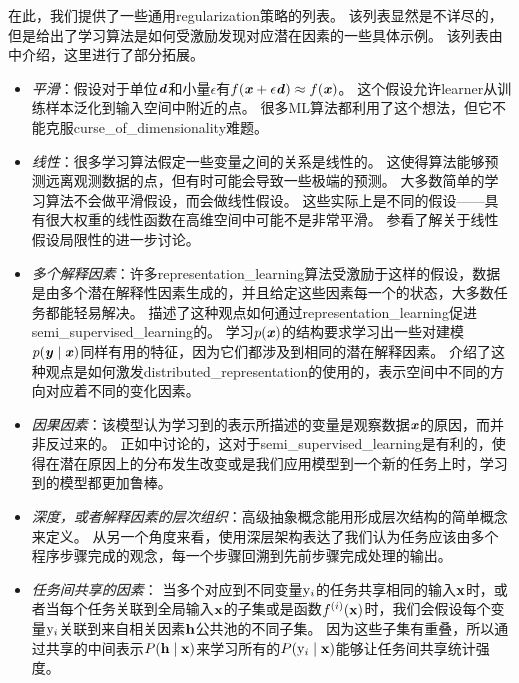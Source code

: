 在此，我们提供了一些通用\gls{regularization}策略的列表。
该列表显然是不详尽的，但是给出了学习算法是如何受激励发现对应潜在因素的一些具体示例。
该列表由\cite{Bengio-Courville-Vincent-TPAMI-2012}中介绍，这里进行了部分拓展。
\begin{itemize}
	\item \emph{平滑}：假设对于单位$\boldsymbol{\mathit{d}}$和小量$\epsilon$有$f(\boldsymbol{\mathit{x}} + \epsilon \boldsymbol{\mathit{d}}) \approx f(\boldsymbol{\mathit{x}})$。
	这个假设允许\gls{learner}从训练样本泛化到输入空间中附近的点。
	很多\gls{ML}算法都利用了这个想法，但它不能克服\gls{curse_of_dimensionality}难题。


	\item \emph{线性}：很多学习算法假定一些变量之间的关系是线性的。
	这使得算法能够预测远离观测数据的点，但有时可能会导致一些极端的预测。
	大多数简单的学习算法不会做平滑假设，而会做线性假设。
	这些实际上是不同的假设——具有很大权重的线性函数在高维空间中可能不是非常平滑。
	参看\cite{Goodfellow-2015-adversarial}了解关于线性假设局限性的进一步讨论。


	\item \emph{多个解释因素}：许多\gls{representation_learning}算法受激励于这样的假设，数据是由多个潜在解释性因素生成的，并且给定这些因素每一个的状态，大多数任务都能轻易解决。
	描述了这种观点如何通过\gls{representation_learning}促进\gls{semi_supervised_learning}的。
	学习$p(\boldsymbol{\mathit{x}})$的结构要求学习出一些对建模$p(\boldsymbol{\mathit{y}}\mid\boldsymbol{\mathit{x}})$同样有用的特征，因为它们都涉及到相同的潜在解释因素。
	介绍了这种观点是如何激发\gls{distributed_representation}的使用的，表示空间中不同的方向对应着不同的变化因素。


	\item \emph{因果因素}：该模型认为学习到的表示所描述的变量是观察数据$\boldsymbol{\mathit{x}}$的原因，而并非反过来的。
	正如中讨论的，这对于\gls{semi_supervised_learning}是有利的，使得在潜在原因上的分布发生改变或是我们应用模型到一个新的任务上时，学习到的模型都更加鲁棒。


	\item \emph{深度，或者解释因素的层次组织}：高级抽象概念能用形成层次结构的简单概念来定义。
	从另一个角度来看，使用深层架构表达了我们认为任务应该由多个程序步骤完成的观念，每一个步骤回溯到先前步骤完成处理的输出。


	\item \emph{任务间共享的因素}：
	当多个对应到不同变量$\mathrm{y}_i$的任务共享相同的输入$\mathbf{x}$时，或者当每个任务关联到全局输入$\mathbf{x}$的子集或是函数$f^{(i)}(\mathbf{x})$时，我们会假设每个变量$\mathrm{y}_i$关联到来自相关因素$\mathbf{h}$公共池的不同子集。
	因为这些子集有重叠，所以通过共享的中间表示$ P(\mathbf{h} \mid \mathbf{x})$来学习所有的$P(\mathrm{y}_i \mid \mathbf{x})$能够让任务间共享统计强度。



\end{itemize}
